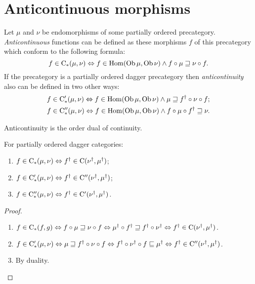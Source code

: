 \section{Anticontinuous morphisms}

Let $\mu$ and $\nu$ be endomorphisms of some partially ordered precategory.
\emph{Anticontinuous} functions can be defined as these morphisms $f$ of this
precategory which conform to the following formula:
\[
f\in\mathrm{C}_{\ast}(\mu,\nu)\Leftrightarrow f\in\operatorname{Hom}(\operatorname{Ob}\mu,\operatorname{Ob}\nu)\land f\circ\mu\sqsupseteq\nu\circ f.
\]
If the precategory is a partially ordered dagger precategory then
\emph{anticontinuity} also can be defined in two other ways:
\begin{gather*}
f\in\mathrm{C}_{\ast}'(\mu,\nu)\Leftrightarrow f\in\operatorname{Hom}(\operatorname{Ob}\mu,\operatorname{Ob}\nu)\land\mu\sqsupseteq f^{\dagger}\circ\nu\circ f;\\
f\in\mathrm{C}_{\ast}''(\mu,\nu)\Leftrightarrow f\in\operatorname{Hom}(\operatorname{Ob}\mu,\operatorname{Ob}\nu)\land f\circ\mu\circ f^{\dagger}\sqsupseteq\nu.
\end{gather*}

Anticontinuity is the order dual of continuity.

\begin{thm}
For partially ordered dagger categories:
\begin{enumerate}
\item $f\in\mathrm{C}_{\ast}(\mu,\nu)\Leftrightarrow f^{\dagger}\in\mathrm{C}(\nu^{\dagger},\mu^{\dagger})$;
\item $f\in\mathrm{C}_{\ast}'(\mu,\nu)\Leftrightarrow f^{\dagger}\in\mathrm{C}''(\nu^{\dagger},\mu^{\dagger})$;
\item $f\in\mathrm{C}_{\ast}''(\mu,\nu)\Leftrightarrow f^{\dagger}\in\mathrm{C}'(\nu^{\dagger},\mu^{\dagger})$.
\end{enumerate}
\end{thm}

\begin{proof}
~
\begin{enumerate}
\item $f\in\mathrm{C}_{\ast}(f,g)\Leftrightarrow
f\circ\mu\sqsupseteq\nu\circ f\Leftrightarrow
\mu^{\dagger}\circ f^{\dagger}\sqsupseteq f^{\dagger}\circ\nu^{\dagger}\Leftrightarrow
f^{\dagger}\in\mathrm{C}(\nu^{\dagger},\mu^{\dagger})$.
\item $f\in\mathrm{C}_{\ast}'(\mu,\nu)\Leftrightarrow
\mu\sqsupseteq f^{\dagger}\circ\nu\circ f\Leftrightarrow
f^{\dagger}\circ\nu^{\dagger}\circ f\sqsubseteq\mu^{\dagger}\Leftrightarrow
f^{\dagger}\in\mathrm{C}''(\nu^{\dagger},\mu^{\dagger})$.
\item By duality.
\end{enumerate}
\end{proof}

